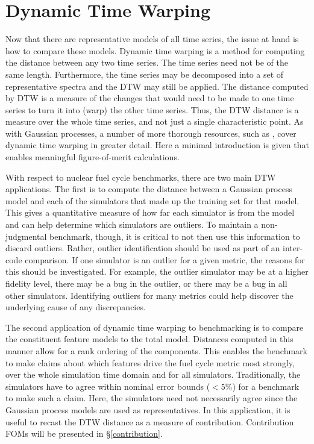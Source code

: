 \clearpage
\section{Dynamic Time Warping}
\label{dtw}

Now that there are representative models of all time series, the issue at hand is
how to compare these models. Dynamic time warping
is a method for computing the distance between any two time series. The time 
series need not be of the same length.  Furthermore, the time series may be 
decomposed into a set of representative spectra and the DTW may still be applied.
The distance computed by DTW is a measure of the changes that would need to be 
made to one time series to turn it into (warp) the other time series. Thus, 
the DTW distance is a measure over the whole time series, and not just a 
single characteristic point. As with Gaussian processes, a number of more thorough
resources, such as \cite{muller}, cover dynamic time warping in greater detail.
Here a minimal introduction is given that enables meaningful figure-of-merit 
calculations.

With respect to nuclear fuel cycle benchmarks, there are two main DTW applications.
The first is to compute the distance between a Gaussian process model and each of 
the simulators that made up the training set for that model. This gives a 
quantitative measure 
of how far each simulator is from the model and can help determine which 
simulators are outliers. To maintain a non-judgmental benchmark, though, it is 
critical to not then use this information to discard outliers.  Rather, outlier
identification should be used as part of an inter-code comparison. If one simulator
is an outlier for a given metric, the reasons for this should be investigated. 
For example, the outlier simulator may be at a higher fidelity level, there may be 
a bug in the outlier, or there may be a bug in all other simulators. Identifying 
outliers for many metrics could help discover the underlying cause of any 
discrepancies.

The second application of dynamic time warping to benchmarking is to compare 
the constituent 
feature models to the total model.  Distances computed in this manner allow 
for a rank ordering of the components.  This enables the benchmark to make claims
about which features drive the fuel cycle metric most strongly, over the whole 
simulation time domain and for all simulators. Traditionally, the simulators have 
to agree
within nominal error bounds ($<5\%$) for a benchmark to make such a claim.  Here,
the simulators need not necessarily agree since the Gaussian process models are
used as representatives.  In this application, it is useful to recast the DTW 
distance as a measure of contribution.  Contribution FOMs will be presented in 
\S\ref{contribution}.


